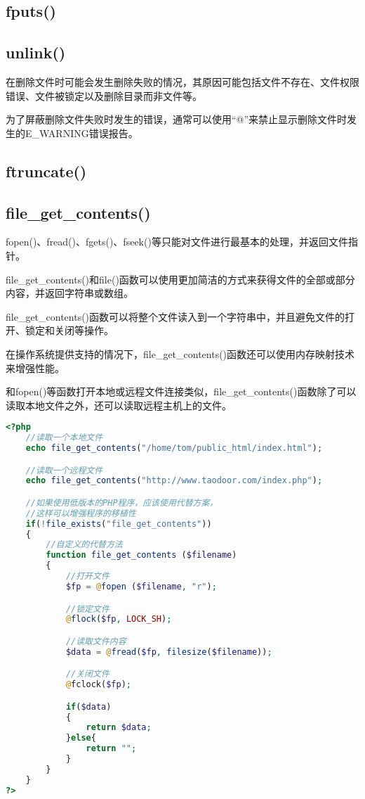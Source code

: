 \subsection{fputs()}


\subsection{unlink()}


在删除文件时可能会发生删除失败的情况，其原因可能包括文件不存在、文件权限错误、文件被锁定以及删除目录而非文件等。

为了屏蔽删除文件失败时发生的错误，通常可以使用“@”来禁止显示删除文件时发生的E\_WARNING错误报告。


\subsection{ftruncate()}



\subsection{file\_get\_contents()}

fopen()、fread()、fgets()、fseek()等只能对文件进行最基本的处理，并返回文件指针。

file\_get\_contents()和file()函数可以使用更加简洁的方式来获得文件的全部或部分内容，并返回字符串或数组。

file\_get\_contents()函数可以将整个文件读入到一个字符串中，并且避免文件的打开、锁定和关闭等操作。

在操作系统提供支持的情况下，file\_get\_contents()函数还可以使用内存映射技术来增强性能。

和fopen()等函数打开本地或远程文件连接类似，file\_get\_contents()函数除了可以读取本地文件之外，还可以读取远程主机上的文件。

\begin{lstlisting}[language=PHP]
<?php
	//读取一个本地文件
	echo file_get_contents("/home/tom/public_html/index.html");

	//读取一个远程文件
	echo file_get_contents("http://www.taodoor.com/index.php");

	//如果使用低版本的PHP程序，应该使用代替方案，
	//这样可以增强程序的移植性
	if(!file_exists("file_get_contents"))
	{
		//自定义的代替方法
		function file_get_contents ($filename)
		{
			//打开文件
			$fp = @fopen ($filename, "r");

			//锁定文件
			@flock($fp, LOCK_SH);

			//读取文件内容
			$data = @fread($fp, filesize($filename));

			//关闭文件
			@fclock($fp);

			if($data)
			{
				return $data;
			}else{
				return "";
			}
		}
	}
?>
\end{lstlisting}



